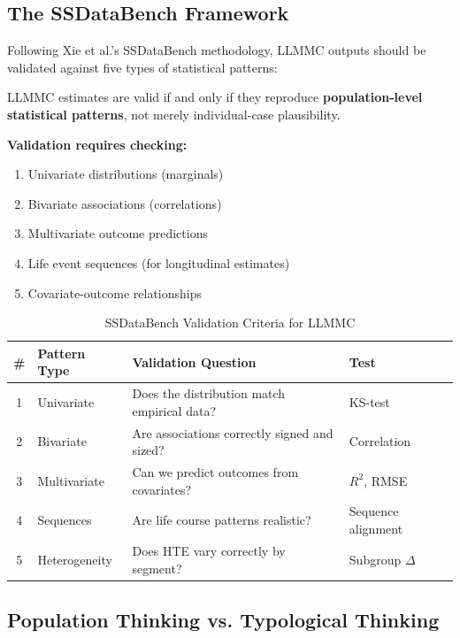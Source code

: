 \subsection{The SSDataBench Framework}

Following Xie et al.'s SSDataBench methodology, LLMMC outputs should be validated
against five types of statistical patterns:

\begin{tcolorbox}[colback=blue!5!white, colframe=blue!75!black,
    title=Axiom UNMAPPED_CAL-5: Population Statistical Realism (Xie Criterion)]
LLMMC estimates are valid if and only if they reproduce \textbf{population-level
statistical patterns}, not merely individual-case plausibility.

\textbf{Validation requires checking:}
\begin{enumerate}[nosep]
\item Univariate distributions (marginals)
\item Bivariate associations (correlations)
\item Multivariate outcome predictions
\item Life event sequences (for longitudinal estimates)
\item Covariate-outcome relationships
\end{enumerate}
\end{tcolorbox}

\begin{table}[h]
\centering
\caption{SSDataBench Validation Criteria for LLMMC}
\label{tab:ssdatabench}
\begin{tabular}{clp{5cm}l}
\toprule
\textbf{\#} & \textbf{Pattern Type} & \textbf{Validation Question} & \textbf{Test} \\
\midrule
1 & Univariate & Does the distribution match empirical data? & KS-test \\
2 & Bivariate & Are associations correctly signed and sized? & Correlation \\
3 & Multivariate & Can we predict outcomes from covariates? & $R^2$, RMSE \\
4 & Sequences & Are life course patterns realistic? & Sequence alignment \\
5 & Heterogeneity & Does HTE vary correctly by segment? & Subgroup $\Delta$ \\
\bottomrule
\end{tabular}
\end{table}

\subsection{Population Thinking vs. Typological Thinking}

